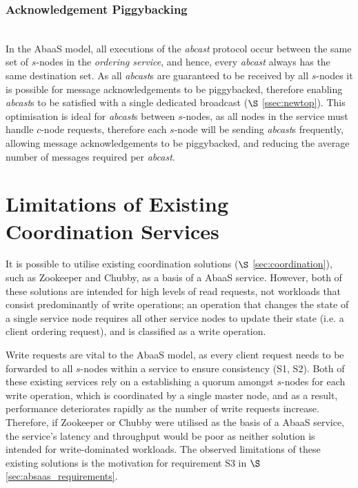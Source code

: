 		\subsubsection{Acknowledgement Piggybacking} \hspace{0pt} \\
		In the \textsf{AbaaS} model, all executions of the \emph{abcast} protocol occur between the same set of $s$-nodes in the \emph{ordering service}, and hence, every \emph{abcast} always has the same destination set.  As all \emph{abcast}s are guaranteed to be received by all $s$-nodes it is possible for message acknowledgements to be piggybacked, therefore enabling \emph{abcast}s to be satisfied with a single dedicated broadcast ($\S$ \ref{ssec:newtop}).  This optimisation is ideal for \emph{abcast}s between $s$-nodes, as all nodes in the service must handle $c$-node requests, therefore each $s$-node will be sending \emph{abcast}s frequently, allowing message acknowledgements to be piggybacked, and reducing the average number of messages required per \emph{abcast}.  	
	
\section{Limitations of Existing Coordination Services}\label{sec:limitations_existing_coordination}
It is possible to utilise existing coordination solutions ($\S$ \ref{sec:coordination}), such as Zookeeper\citep{Hunt:2010:ZWC:1855840.1855851} and Chubby\citep{Burrows:2006:CLS:1298455.1298487}, as a basis of a \textsf{AbaaS} service.  However, both of these solutions are intended for high levels of read requests, not workloads that consist predominantly of write operations; an operation that changes the state of a single service node requires all other service nodes to update their state (i.e. a client ordering request), and is classified as a write operation.  

Write requests are vital to the \textsf{AbaaS} model, as every client request needs to be forwarded to all $s$-nodes within a service to ensure consistency (S1, S2).  Both of these existing services rely on a establishing a quorum amongst $s$-nodes for each write operation, which is coordinated by a single master node, and as a result, performance deteriorates rapidly as the number of write requests increase.  Therefore, if Zookeeper or Chubby were utilised as the basis of a \textsf{AbaaS} service, the service's latency and throughput would be poor as neither solution is intended for write-dominated workloads.  The observed limitations of these existing solutions is the motivation for requirement S3 in $\S$ \ref{sec:absaas_requirements}.  	
	
